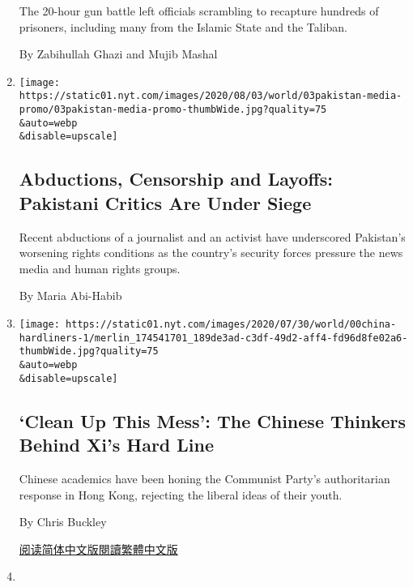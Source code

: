 \begin{enumerate}
  The 20-hour gun battle left officials scrambling to recapture hundreds
  of prisoners, including many from the Islamic State and the Taliban.

  By Zabihullah Ghazi and Mujib Mashal
\item
  \href{/2020/08/03/world/asia/pakistan-media-abductions.html}{}

  \texttt{[image: https://static01.nyt.com/images/2020/08/03/world/03pakistan-media-promo/03pakistan-media-promo-thumbWide.jpg?quality=75\\\&auto=webp\\\&disable=upscale]}

  \hypertarget{abductions-censorship-and-layoffs-pakistani-critics-are-under-siege}{%
  \subsection{Abductions, Censorship and Layoffs: Pakistani Critics Are
  Under
  Siege}\label{abductions-censorship-and-layoffs-pakistani-critics-are-under-siege}}

  Recent abductions of a journalist and an activist have underscored
  Pakistan's worsening rights conditions as the country's security
  forces pressure the news media and human rights groups.

  By Maria Abi-Habib
\item
  \href{/2020/08/02/world/asia/china-hong-kong-national-security-law.html}{}

  \texttt{[image: https://static01.nyt.com/images/2020/07/30/world/00china-hardliners-1/merlin\_174541701\_189de3ad-c3df-49d2-aff4-fd96d8fe02a6-thumbWide.jpg?quality=75\\\&auto=webp\\\&disable=upscale]}

  \hypertarget{clean-up-this-mess-the-chinese-thinkers-behind-xis-hard-line}{%
  \subsection{`Clean Up This Mess': The Chinese Thinkers Behind Xi's
  Hard
  Line}\label{clean-up-this-mess-the-chinese-thinkers-behind-xis-hard-line}}

  Chinese academics have been honing the Communist Party's authoritarian
  response in Hong Kong, rejecting the liberal ideas of their youth.

  By Chris Buckley

  \href{https://cn.nytimes.com/china/20200803/china-hong-kong-national-security-law/}{阅读简体中文版}\href{https://cn.nytimes.com/china/20200803/china-hong-kong-national-security-law/zh-hant/}{閱讀繁體中文版}
\item
  \href{/2020/08/02/briefing/coronavirus-vaccine-india-us-tiktok-spacex.html}{}


\end{enumerate}
